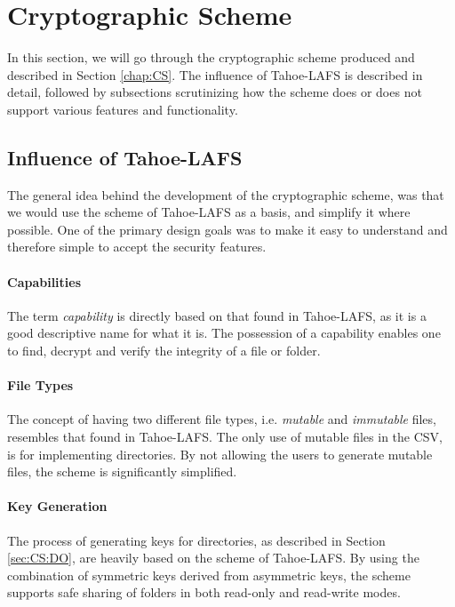 \documentclass[pdftex,english,10pt,b5paper,twoside]{book}
\begin{document}

\section{Cryptographic Scheme}

In this section, we will go through the cryptographic scheme produced and
described in Section \ref{chap:CS}. The influence of Tahoe-\ac{LAFS} is
described in detail, followed by subsections scrutinizing how the scheme does
or does not support various features and functionality.

\subsection{Influence of Tahoe-LAFS}

The general idea behind the development of the cryptographic scheme, was that
we would use the scheme of Tahoe-\ac{LAFS} as a basis, and simplify it where
possible. One of the primary design goals was to make it easy to
understand and therefore simple to accept the security features.

\paragraph{Capabilities} The term \emph{capability} is directly based on that
found in Tahoe-\ac{LAFS}, as it is a good descriptive name for what it is. The
possession of a capability enables one to find, decrypt and verify the
integrity of a file or folder.

\paragraph{File Types} The concept of having two different file types, i.e.
\emph{mutable} and \emph{immutable} files, resembles that found in
Tahoe-\ac{LAFS}. The only use of mutable files in the \acl{CSV}, is for
implementing directories. By not allowing the users to generate mutable files,
the scheme is significantly simplified.

\paragraph{Key Generation} The process of generating keys for directories, as
described in Section \ref{sec:CS:DO}, are heavily based on the scheme of
Tahoe-\ac{LAFS}. By using the combination of symmetric keys derived from
asymmetric keys, the scheme supports safe sharing of folders in both read-only
and read-write modes.
\end{document}
